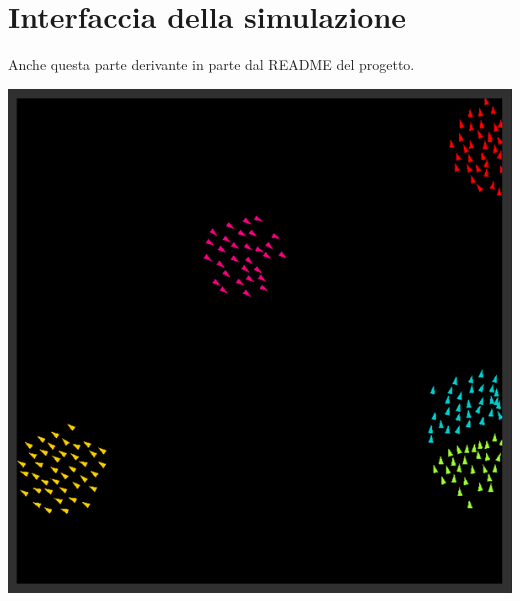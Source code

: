 \documentclass[10pt,a4paper]{article}
\begin{document}
\newpage

\section{Interfaccia della simulazione}

Anche questa parte derivante in parte dal README del progetto.





\begin{center}
    \includegraphics[width=1.0\textwidth]{../images/interface.png}
\end{center}
\end{document}

